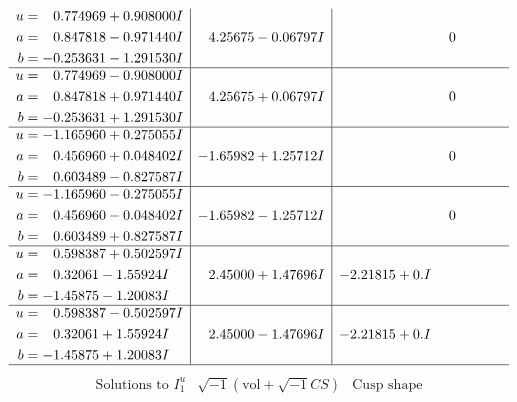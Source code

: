 \documentclass[1p]{elsarticle_modified}
\theoremstyle{definition}
\newcommand{\I}{\sqrt{-1}}
\begin{document}
$$\begin{array}{c|c|c}
\begin{aligned}
u &= \phantom{-}0.774969 + 0.908000 I \\
a &= \phantom{-}0.847818 - 0.971440 I \\
b &= -0.253631 - 1.291530 I\end{aligned}
 & \phantom{-}4.25675 - 0.06797 I & \phantom{-0.000000 } 0 \\ \hline\begin{aligned}
u &= \phantom{-}0.774969 - 0.908000 I \\
a &= \phantom{-}0.847818 + 0.971440 I \\
b &= -0.253631 + 1.291530 I\end{aligned}
 & \phantom{-}4.25675 + 0.06797 I & \phantom{-0.000000 } 0 \\ \hline\begin{aligned}
u &= -1.165960 + 0.275055 I \\
a &= \phantom{-}0.456960 + 0.048402 I \\
b &= \phantom{-}0.603489 - 0.827587 I\end{aligned}
 & -1.65982 + 1.25712 I & \phantom{-0.000000 } 0 \\ \hline\begin{aligned}
u &= -1.165960 - 0.275055 I \\
a &= \phantom{-}0.456960 - 0.048402 I \\
b &= \phantom{-}0.603489 + 0.827587 I\end{aligned}
 & -1.65982 - 1.25712 I & \phantom{-0.000000 } 0 \\ \hline\begin{aligned}
u &= \phantom{-}0.598387 + 0.502597 I \\
a &= \phantom{-}0.32061 - 1.55924 I \\
b &= -1.45875 - 1.20083 I\end{aligned}
 & \phantom{-}2.45000 + 1.47696 I & -2.21815 + 0. I\phantom{ +0.000000I} \\ \hline\begin{aligned}
u &= \phantom{-}0.598387 - 0.502597 I \\
a &= \phantom{-}0.32061 + 1.55924 I \\
b &= -1.45875 + 1.20083 I\end{aligned}
 & \phantom{-}2.45000 - 1.47696 I & -2.21815 + 0. I\phantom{ +0.000000I}\\
 \hline 
 \end{array}$$\newpage$$\begin{array}{c|c|c}  
\text{Solutions to }I^u_{1}& \I (\text{vol} + \sqrt{-1}CS) & \text{Cusp shape}\\

\end{array}$$
\end{document}
